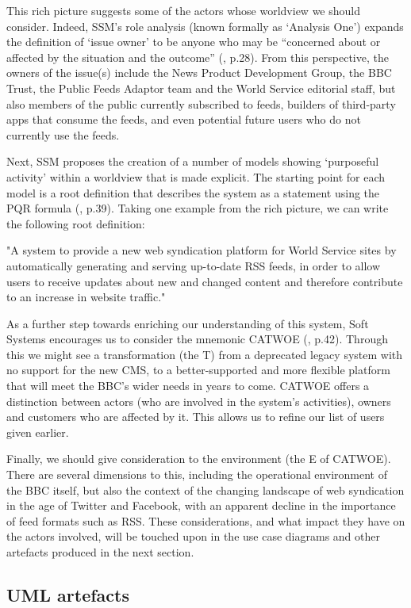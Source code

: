 \documentclass[runningheads,a4paper]{llncs}
\begin{document}
This rich picture suggests some of the actors whose worldview we should consider. Indeed, SSM's role analysis (known formally as `Analysis One') expands the definition of `issue owner' to be anyone who may be ``concerned about or affected by the situation and the outcome'' (\cite{checkland2006}, p.28). From this perspective, the owners of the issue(s) include the News Product Development Group, the BBC Trust, the Public Feeds Adaptor team and the World Service editorial staff, but also members of the public currently subscribed to feeds, builders of third-party apps that consume the feeds, and even potential future users who do not currently use the feeds.

Next, SSM proposes the creation of a number of models showing `purposeful activity' within a worldview that is made explicit. The starting point for each model is a root definition that describes the system as a statement using the PQR formula (\cite{checkland2006}, p.39). Taking one example from the rich picture, we can write the following root definition:

"A system to provide a new web syndication platform for World Service sites by automatically generating and serving up-to-date RSS feeds, in order to allow users to receive updates about new and changed content and therefore contribute to an increase in website traffic."

As a further step towards enriching our understanding of this system, Soft Systems encourages us to consider the mnemonic CATWOE (\cite{checkland2006}, p.42). Through this we might see a transformation (the T) from a deprecated legacy system with no support for the new CMS, to a better-supported and more flexible platform that will meet the BBC's wider needs in years to come. CATWOE offers a distinction between actors (who are involved in the system's activities), owners and customers who are affected by it. This allows us to refine our list of users given earlier.

Finally, we should give consideration to the environment (the E of CATWOE). There are several dimensions to this, including the operational environment of the BBC itself, but also the context of the changing landscape of web syndication in the age of Twitter and Facebook, with an apparent decline in the importance of feed formats such as RSS. These considerations, and what impact they have on the actors involved, will be touched upon in the use case diagrams and other artefacts produced in the next section.


\subsection{UML artefacts}
\end{document}
